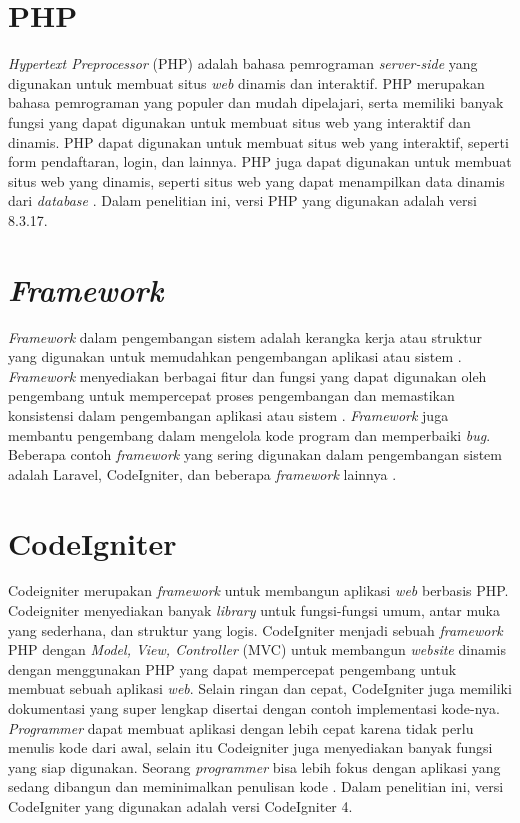 \section{PHP}
\textit{Hypertext Preprocessor} (PHP) adalah bahasa pemrograman \textit{server-side} yang digunakan untuk membuat situs \textit{web} dinamis dan interaktif. PHP merupakan bahasa pemrograman yang populer dan mudah dipelajari, serta memiliki banyak fungsi yang dapat digunakan untuk membuat situs web yang interaktif dan dinamis. PHP dapat digunakan untuk membuat situs web yang interaktif, seperti form pendaftaran, login, dan lainnya. PHP juga dapat digunakan untuk membuat situs web yang dinamis, seperti situs web yang dapat menampilkan data dinamis dari \textit{database} \cite{Cowls2021ADB}. Dalam penelitian ini, versi PHP yang digunakan adalah versi 8.3.17.


\section{\textit{Framework}}
\textit{Framework} dalam pengembangan sistem adalah kerangka kerja atau struktur yang digunakan untuk memudahkan pengembangan aplikasi atau sistem \cite{sallaby2020perancangan}. \textit{Framework} menyediakan berbagai fitur dan fungsi yang dapat digunakan oleh pengembang untuk mempercepat proses pengembangan dan memastikan konsistensi dalam pengembangan aplikasi atau sistem \cite{simanullang2021sistem}. \textit{Framework} juga membantu pengembang dalam mengelola kode program dan memperbaiki \textit{bug}. Beberapa contoh \textit{framework} yang sering digunakan dalam pengembangan sistem adalah Laravel, CodeIgniter, dan beberapa \textit{framework} lainnya \cite{Fadllullah2022PengembanganSI}.

\section{CodeIgniter}
Codeigniter merupakan \textit{framework} untuk membangun aplikasi \textit{web} berbasis PHP. Codeigniter menyediakan banyak \textit{library} untuk fungsi-fungsi umum, antar muka yang sederhana, dan struktur yang logis. CodeIgniter menjadi sebuah \textit{framework} PHP dengan \textit{Model, View, Controller} (MVC) untuk membangun \textit{website} dinamis dengan menggunakan PHP yang dapat mempercepat pengembang untuk membuat sebuah aplikasi \textit{web}. Selain ringan dan cepat, CodeIgniter juga memiliki dokumentasi yang super lengkap disertai dengan contoh implementasi kode-nya. \textit{Programmer} dapat membuat aplikasi dengan lebih cepat karena tidak perlu menulis kode dari awal, selain itu Codeigniter juga menyediakan banyak fungsi yang siap digunakan. Seorang \textit{programmer} bisa lebih fokus dengan aplikasi yang sedang dibangun dan meminimalkan penulisan kode \cite{tyowati2017implementasi}. Dalam penelitian ini, versi CodeIgniter yang digunakan adalah versi CodeIgniter 4.

